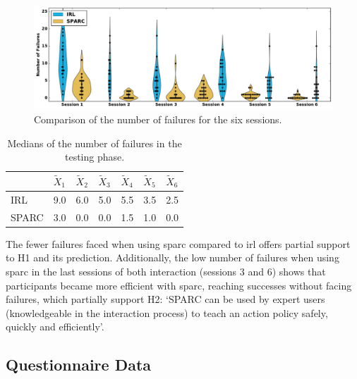 \begin{figure}[ht]
	\includegraphics[width=\textwidth]{failures.pdf}
	\centering
	\caption{Comparison of the number of failures for the six sessions.
	}
	\label{fig:control_failures}
\end{figure}

\begin{table}[ht]
	\centering
	\caption{Medians of the number of failures in the testing phase.}
	\label{tab:control_failures}
	\begin{tabular}{@{}lllllll@{}}\toprule
		& $\widetilde{X}_{1}$ & $\widetilde{X}_{2}$ & $\widetilde{X}_{3}$ & $\widetilde{X}_{4}$ & $\widetilde{X}_{5}$ & $\widetilde{X}_{6}$\\ 
		\midrule
	    IRL & 9.0 & 6.0 & 5.0 & 5.5 & 3.5 & 2.5\\
	    SPARC & 3.0 & 0.0 & 0.0 & 1.5 & 1.0 & 0.0\\
	    \bottomrule
	\end{tabular}
\end{table}

The fewer failures faced when using \gls{sparc} compared to \gls{irl} offers partial support to H1 and its prediction. Additionally, the low number of failures when using \gls{sparc} in the last sessions of both interaction (sessions 3 and 6) shows that participants became more efficient with \gls{sparc}, reaching successes without facing failures, which partially support H2: `SPARC can be used by expert users (knowledgeable in the interaction process) to teach an action policy safely, quickly and efficiently'.

\subsection{Questionnaire Data}

